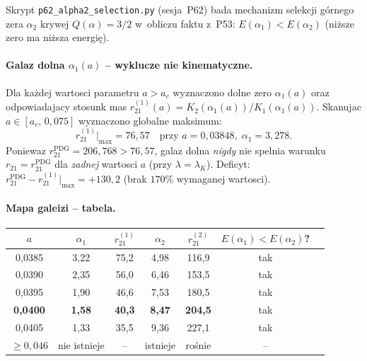Skrypt \texttt{p62\_alpha2\_selection.py} (sesja~P62) bada mechanizm
selekcji g\'ornego zera $\alpha_2$ krywej $Q(\alpha)=3/2$
w~obliczu faktu z~P53: $E(\alpha_1) < E(\alpha_2)$ (ni\.zsze zero
ma ni\.zsza energi\k{e}).

\paragraph{Galaz dolna $\alpha_1(a)$ -- wyklucze nie kinematyczne.}
Dla ka\.zdej wartosci parametru $a>a_c$ wyznaczono dolne zero
$\alpha_1(a)$ oraz odpowiadajacy stosunk mas
$r_{21}^{(1)}(a)=K_2(\alpha_1(a))/K_1(\alpha_1(a))$.
Skanujac $a\in[a_c,\,0{,}075]$ wyznaczono globalne maksimum:
\begin{equation}
  r_{21}^{(1)}\big|_{\max}
  = 76{,}57
  \quad\text{przy }a=0{,}03848,\;\alpha_1=3{,}278.
  \label{eq:r21-lower-max}
\end{equation}
Poniewaz $r_{21}^{\mathrm{PDG}} = 206{,}768 > 76{,}57$,
galaz dolna \emph{nigdy} nie spelnia warunku $r_{21}=r_{21}^{\mathrm{PDG}}$
dla \emph{zadnej} wartosci $a$ (przy $\lambda=\lambda_K$).
Deficyt: $r_{21}^{\mathrm{PDG}} - r_{21}^{(1)}\big|_{\max} = +130{,}2$
(brak $170\%$ wymaganej wartosci).

\paragraph{Mapa galeizi -- tabela.}
\begin{center}
\begin{tabular}{ccccccc}
\hline
$a$ & $\alpha_1$ & $r_{21}^{(1)}$ & $\alpha_2$ & $r_{21}^{(2)}$
    & $E(\alpha_1)<E(\alpha_2)$? \\
\hline
0{,}0385 & 3{,}22 & 75{,}2 & 4{,}98 & 116{,}9 & tak \\
0{,}0390 & 2{,}35 & 56{,}0 & 6{,}46 & 153{,}5 & tak \\
0{,}0395 & 1{,}90 & 46{,}6 & 7{,}53 & 180{,}5 & tak \\
\textbf{0{,}0400} & \textbf{1{,}58} & \textbf{40{,}3} & \textbf{8{,}47} & \textbf{204{,}5} & tak \\
0{,}0405 & 1{,}33 & 35{,}5 & 9{,}36 & 227{,}1 & tak \\
$\geq0{,}046$ & nie istnieje & -- & istnieje & ro\'snie & -- \\
\hline
\end{tabular}
\end{center}

